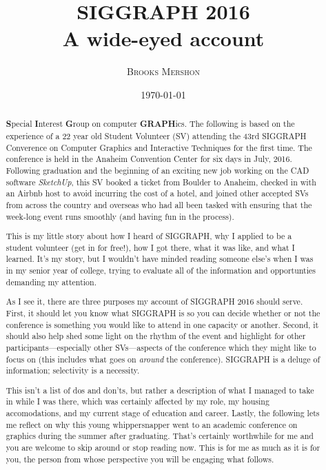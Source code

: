 \documentclass[a4paper, 11pt]{article} %
\title{\textbf{SIGGRAPH 2016}\\ %
A wide-eyed account} %
\author{\textsc{Brooks Mershon}} %
\date{\today} %
\begin{document}
\maketitle %

\eject


\renewcommand{\abstractname}{Forward} %

\begin{abstract}
	\textbf{S}pecial \textbf{I}nterest \textbf{G}roup on computer \textbf{GRAPH}ics. The following is based on the experience of a 22 year old Student Volunteer (SV) attending the 43rd SIGGRAPH Converence on Computer Graphics and Interactive Techniques for the first time. The conference is held in the Anaheim Convention Center for six days in July, 2016. Following graduation and the beginning of an exciting new job working on the CAD software \textit{SketchUp}, this SV booked a ticket from Boulder to Anaheim, checked in with an Airbnb host to avoid incurring the cost of a hotel, and joined other accepted SVs from across the country and overseas who had all been tasked with ensuring that the week-long event runs smoothly (and having fun in the process).
	
	This is my little story about how I heard of SIGGRAPH, why I applied to be a student volunteer (get in for free!), how I got there, what it was like, and what I learned. It's my story, but I wouldn't have minded reading someone else's when I was in my senior year of college, trying to evaluate all of the information and opportunties demanding my attention.
	
	As I see it, there are three purposes my account of SIGGRAPH 2016 should serve.	First, it should let you know what SIGGRAPH is so you can decide whether or not the conference is something you would like to attend in one capacity or another. Second, it should also help shed some light on the rhythm of the event and highlight for other participants---especially other SVs---aspects of the conference which they might like to focus on (this includes what goes on \textit{around} the conference). SIGGRAPH is a deluge of information; selectivity is a necessity.
	
	This isn't a list of dos and don'ts, but rather a description of what I managed to take in while I was there, which was certainly affected by my role, my housing accomodations, and my current stage of education and career. Lastly, the following lets me reflect on why this young whippersnapper went to an academic conference on graphics during the summer after graduating. That's certainly worthwhile for me and you are welcome to skip around or stop reading now. This is for me as much as it is for you, the person from whose perspective you will be engaging what follows.
\end{abstract}
\end{document}
